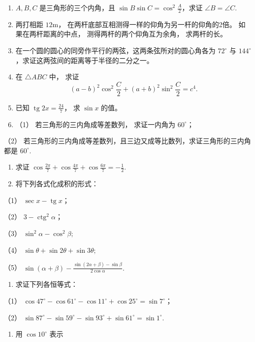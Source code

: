\begin{enumerate}[start=30]
\item
  \(A, B, C\) 是三角形的三个内角，且
  \(\sin B \sin C = \cos^2 \frac{A}{2}\)，求证 \(\angle B = \angle C\).
\item
  两打相距 \(12\mathrm{m}\)，
  在两杆底部互相测得一样的仰角为另一杆的仰角的2倍。
  如果在两杆距离的中点， 测得两杆的两个仰角互为余角， 求两杆的长。
\item
  在一个圆的圆心的同旁作平行的两弦，这两条弦所对的圆心角各为
  \(72^{\circ}\) 与
  \(144^{\circ}\)，求证这两弦间的距离等于半径的二分之一。
\item
  在 \(\triangle ABC\) 中， 求证
\[
(a - b) ^ {2} \cos^ {2} \frac {C}{2} + (a + b) ^ {2} \sin^ {2} \frac {C}{2} = c ^ {4}.
\]
\item
  已知 \(\operatorname{tg} 2x = \frac{24}{7}\)， 求 \(\sin x\) 的值。
\item
  （1） 若三角形的三内角成等差数列， 求证一内角为 \(60^{\circ}\)；
\end{enumerate}

（2）
若三角形的三内角成等差数列，且三边又成等比数列，求证三角形的三内角都是
\(60^{\circ}\).

\begin{enumerate}[start=36]
\item
  求证
  \(\cos \frac{2\pi}{7} + \cos \frac{4\pi}{7} + \cos \frac{6\pi}{7} = -\frac{1}{2}\).
\item
  将下列各式化成积的形式：
\end{enumerate}

（1） \(\sec x - \operatorname{tg} x\)；

（2） \(3 - \operatorname{ctg}^2\alpha\)；

（3） \(\sin^2\alpha -\cos^2\beta ;\)

（4） \(\sin \theta + \sin 2\theta + \sin 3\theta;\)

（5）
\(\sin (\alpha +\beta) - \frac{\sin(2\alpha + \beta) - \sin\beta}{2\cos\alpha}.\)

\begin{enumerate}[start=28]
\item
  求证下列各恒等式：
\end{enumerate}

（1）
\(\cos 47^{\circ} - \cos 61^{\circ} - \cos 11^{\circ} + \cos 25^{\circ} = \sin 7^{\circ}\)；

（2）
\(\sin 87^{\circ} - \sin 59^{\circ} - \sin 93^{\circ} + \sin 61^{\circ} = \sin 1^{\circ}\).

\begin{enumerate}[start=33]
\item
  用 \(\cos 10^{\circ}\) 表示
\end{enumerate}

